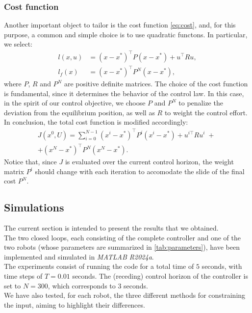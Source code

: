 \subsubsection{Cost function}
Another important object to tailor is the cost function \ref{eq:cost}, and, for this purpose, a common and simple choice is to use quadratic functons. In particular, we select:
\begin{align*}
    l(x,u) &= (x-x^*)^\top P (x-x^*) + u^\top R u,\\
    l_f(x) &= (x-x^*)^\top P^N (x-x^*),
\end{align*}
where $P$, $R$ and $P^N$ are positive definite matrices. The choice of the cost function is fundamental, since it determines the behavior of the control law. In this case, in the spirit of our control objective, we choose $P$ and $P^N$ to penalize the deviation from the equilibrium position, as well as $R$ to weight the control effort. \\
In conclusion, the total cost function is modified accordingly:
\begin{gather*}
    J(x^0, U) = \sum_{i=0}^{N-1} (x^i-x^*)^\top P^i (x^i-x^*) + u^{i\top} R u^i \;+\;\\ +(x^N-x^*)^\top P^N (x^N-x^*).
\end{gather*}
Notice that, since $J$ is evaluated over the current control horizon, the weight matrix $P^i$ should change with each iteration to accomodate the slide of the final cost $P^N$. \\

\subsection{Simulations}
The current section is intended to present the results that we obtained. \\
The two closed loops, each consisting of the complete controller and one of the two robots (whose parameters are summarized in \ref{tab:parameters}), have been implemented and simulated in \textit{MATLAB R2024a}. \\
The experiments consist of running the code for a total time of $5$ seconds, with time steps of $T = 0.01$ seconds. The (receding) control horizon of the controller is set to $N = 300$, which corresponds to $3$ seconds. \\
We have also tested, for each robot, the three different methods for constraining the input, aiming to highlight their differences.

